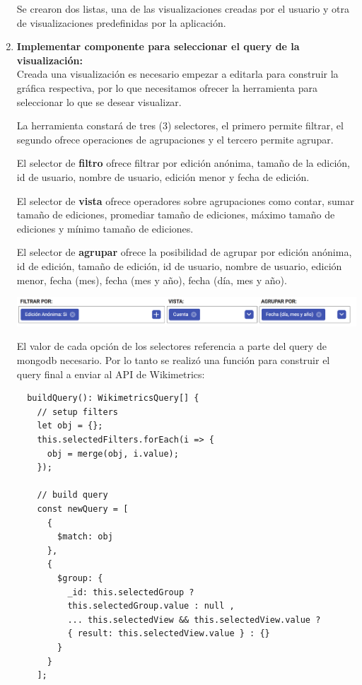 \begin{enumerate}
  Se crearon dos listas, una de las visualizaciones creadas por el usuario y otra de visualizaciones predefinidas por la aplicación.
 
  \item\textbf{Implementar componente para seleccionar el query de la visualización:}\\

  Creada una visualización es necesario empezar a editarla para construir la gráfica respectiva, por lo que necesitamos ofrecer la herramienta para seleccionar lo que se desear visualizar.
  
  La herramienta constará de tres (3) selectores, el primero permite filtrar, el segundo ofrece operaciones de agrupaciones y el tercero permite agrupar.
  
  El selector de \textbf{filtro} ofrece filtrar por edición anónima, tamaño de la edición, id de usuario, nombre de usuario, edición menor y fecha de edición.
  
  El selector de \textbf{vista} ofrece operadores sobre agrupaciones como contar, sumar tamaño de ediciones, promediar tamaño de ediciones, máximo tamaño de ediciones y mínimo tamaño de ediciones.
  
  El selector de \textbf{agrupar} ofrece la posibilidad de agrupar por edición anónima, id de edición, tamaño de edición, id de usuario, nombre de usuario, edición menor, fecha (mes), fecha (mes y año), fecha (día, mes y año).
  
  
  \begin{center}
      \bigbreak
      \includegraphics[scale=0.3]{images/marco_aplicativo/query_selector.png}
      \label{fig:query_selector}
      \bigbreak
  \end{center}
  
  El valor de cada opción de los selectores referencia a parte del query de mongodb necesario. Por lo tanto se realizó una función para construir el query final a enviar al API de Wikimetrics:
  
  \begin{verbatim}
  buildQuery(): WikimetricsQuery[] {
    // setup filters
    let obj = {};
    this.selectedFilters.forEach(i => {
      obj = merge(obj, i.value);
    });

    // build query
    const newQuery = [
      {
        $match: obj
      },
      {
        $group: {
          _id: this.selectedGroup ?
          this.selectedGroup.value : null ,
          ... this.selectedView && this.selectedView.value ?
          { result: this.selectedView.value } : {}
        }
      }
    ];


\end{verbatim}
\end{enumerate}
